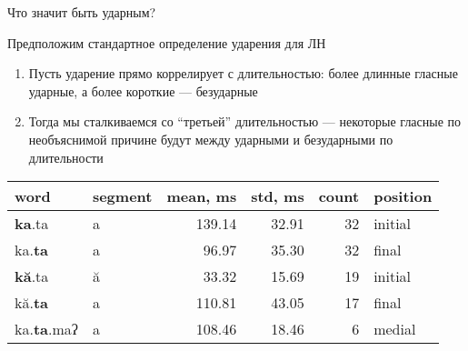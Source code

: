 \documentclass[10 pt, handout]{beamer}
\begin{document}
\begin{frame}{Что значит быть ударным?}

	Предположим стандартное определение ударения для ЛН
	\vspace*{1em}
	
	\begin{enumerate}[\ding{164}]
		\item Пусть ударение прямо коррелирует с длительностью: более длинные гласные ударные, а более короткие --- безударные
		\item Тогда мы сталкиваемся со ``третьей'' длительностью --- некоторые гласные по необъяснимой причине будут между ударными и безударными по длительности
	\end{enumerate}
		
	\vspace*{1em}
\begin{table}[H]
\centering
\begin{tabular}{llrrrl}
\toprule
word & segment &  mean, ms &  std, ms &  count & position \\
\midrule
\textbf{ka}.ta &       a &    139.14 &    32.91 &     32 &  initial \\
ka.\textbf{ta} &       a &     96.97 &    35.30 &     32 &    final \\[.5em]

\textbf{kă}.ta &       ă &     33.32 &    15.69 &     19 &  initial \\
kă.\textbf{ta} &       a &    110.81 &    43.05 &     17 &    final \\[.5em]

ka.\textbf{ta}.maʔ &       a &    108.46 &    18.46 &      6 &   medial \\
\bottomrule
\end{tabular}
\end{table}

\end{frame}
\end{document}

